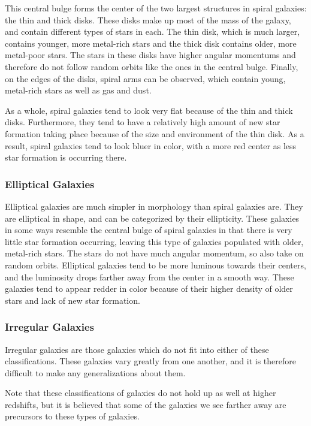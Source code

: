 \documentclass[12pt]{article}
\begin{document}
    This central bulge forms the center of the two largest structures in spiral
    galaxies: the thin and thick disks.  These disks make up most of the mass of
    the galaxy, and contain different types of stars in each.  The thin disk,
    which is much larger, contains younger, more metal-rich stars and the thick
    disk contains older, more metal-poor stars.  The stars in these disks have
    higher angular momentums and therefore do not follow random orbits like the
    ones in the central bulge.  Finally, on the edges of the disks, spiral arms
    can be observed, which contain young, metal-rich stars as well as gas and
    dust.

    As a whole, spiral galaxies tend to look very flat because of the thin and
    thick disks.  Furthermore, they tend to have a relatively high amount of new
    star formation taking place because of the size and environment of the thin
    disk.  As a result, spiral galaxies tend to look bluer in color, with a more
    red center as less star formation is occurring there.

    \subsubsection{Elliptical Galaxies}
    Elliptical galaxies are much simpler in morphology than spiral galaxies are.
    They are elliptical in shape, and can be categorized by their ellipticity.
    These galaxies in some ways resemble the central bulge of spiral galaxies in
    that there is very little star formation occurring, leaving this type of
    galaxies populated with older, metal-rich stars.  The stars do not have much
    angular momentum, so also take on random orbits.  Elliptical galaxies tend
    to be more luminous towards their centers, and the luminosity drops farther
    away from the center in a smooth way.  These galaxies tend to appear redder
    in color because of their higher density of older stars and lack of new star
    formation.

    \subsubsection{Irregular Galaxies}
    Irregular galaxies are those galaxies which do not fit into either of these
    classifications.  These galaxies vary greatly from one another, and it is
    therefore difficult to make any generalizations about them.

    Note that these classifications of galaxies do not hold up as well at higher
    redshifts, but it is believed that some of the galaxies we see farther away
    are precursors to these types of galaxies.
\end{document}

